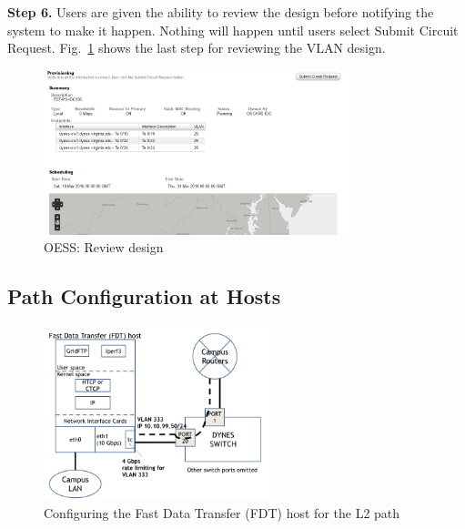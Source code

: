 {\textbf{Step 6.}
Users are given the ability to review the design before notifying the system to make it happen.  Nothing will happen until users select Submit Circuit Request.
Fig.~\ref{fig:oessreview} shows the last step for reviewing the VLAN design.
\begin{figure}[htb!]
\centering
\includegraphics[width=0.8\textwidth]{figures/oess-review.png}
\caption{OESS: Review design}
\label{fig:oessreview}
\end{figure}





\subsection{Path Configuration at Hosts}
\label{sec:fdtconf}
\begin{figure}
\centering
\includegraphics[width=0.6\textwidth]{figures/uvadynes.png}
\caption{Configuring the Fast Data Transfer (FDT) host for the L2 path}
\label{fig:uvadynes}
\end{figure}

}
